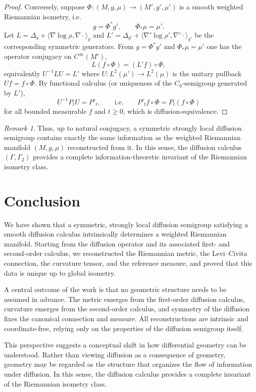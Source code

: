 \documentclass[11pt]{amsart}
\theoremstyle{definition}
\theoremstyle{remark}
\newtheorem{remark}[theorem]{Remark}
\begin{document}
\begin{proof}
Conversely, suppose $\Phi:(M,g,\mu)\to(M',g',\mu')$ is a smooth weighted Riemannian isometry, i.e.
\[
g=\Phi^*g',\qquad \Phi_*\mu=\mu'.
\]
Let $L=\Delta_g+\langle \nabla\log\rho,\nabla\cdot\rangle_g$ and
$L'=\Delta_{g'}+\langle \nabla'\log\rho',\nabla'\cdot\rangle_{g'}$ be the corresponding symmetric generators.
From $g=\Phi^*g'$ and $\Phi_*\mu=\mu'$ one has the operator conjugacy on $C^\infty(M')$,
\[
L(f\circ\Phi)=(L'f)\circ\Phi,
\]
equivalently $U^{-1}LU=L'$ where $U:L^2(\mu')\to L^2(\mu)$ is the unitary pullback $Uf=f\circ\Phi$.
By functional calculus (or uniqueness of the $C_0$-semigroup generated by $L'$),
\[
U^{-1}P_tU=P'_t,
\qquad\text{i.e.}\qquad
P'_t f\circ\Phi=P_t(f\circ\Phi)
\]
for all bounded measurable $f$ and $t\ge0$, which is diffusion-equivalence.
\end{proof}


\begin{remark}
Thus, up to natural conjugacy, a symmetric strongly local diffusion semigroup
contains exactly the same information as the weighted Riemannian manifold
$(M,g,\mu)$ reconstructed from it.
In this sense, the diffusion calculus $(\Gamma,\Gamma_2)$ provides a complete
information-theoretic invariant of the Riemannian isometry class.
\end{remark}

\section{Conclusion}

We have shown that a symmetric, strongly local diffusion semigroup satisfying a smooth diffusion calculus intrinsically
determines a weighted Riemannian manifold.
Starting from the diffusion operator and its associated first- and second-order
calculus, we reconstructed the Riemannian metric, the Levi--Civita connection,
the curvature tensor, and the reference measure, and proved that this data is
unique up to global isometry.

A central outcome of the work is that no geometric structure needs to be assumed
in advance.
The metric emerges from the first-order diffusion calculus, curvature emerges
from the second-order calculus, and symmetry of the diffusion fixes the canonical
connection and measure.
All reconstructions are intrinsic and coordinate-free, relying only on the
properties of the diffusion semigroup itself.

This perspective suggests a conceptual shift in how differential geometry can
be understood.
Rather than viewing diffusion as a consequence of geometry, geometry may be
regarded as the structure that organizes the flow of information under diffusion.
In this sense, the diffusion calculus provides a complete invariant of the
Riemannian isometry class.
\end{document}
